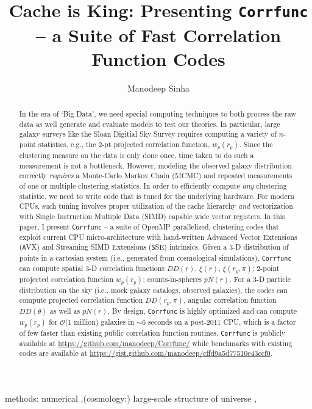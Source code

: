 \documentclass[preprint, 12pt, authoryear]{elsarticle}
\newcommand{\xir}{\ensuremath{{DD(r)}}\xspace}
\newcommand{\xiofr}{\ensuremath{{\xi(r)}}\xspace}
\newcommand{\wprp}{\ensuremath{{w_p(r_p)}}\xspace}
\newcommand{\xirppi}{\ensuremath{{\xi(r_p,\pi)}}\xspace}
\newcommand{\cis}{\ensuremath{{pN(r)}}\xspace}
\newcommand{\ddrppi}{\ensuremath{{DD(r_p,\pi)}}\xspace}
\newcommand{\wtheta}{\ensuremath{{DD(\theta)}}\xspace}
\newcommand{\avx}{\texttt AVX}
\newcommand{\sse}{\texttt SSE}
\begin{document}
\begin{frontmatter}

\title{Cache is King: Presenting {\tt Corrfunc} -- a Suite of Fast Correlation Function Codes}

\author[ms]{Manodeep Sinha}
\address[ms]{6902 Stevenson Center, Department of Physics \& Astronomy, Vanderbilt University, Nashville, TN 37235}

\begin{abstract}
In the era of `Big Data', we need special computing techniques to both process the raw data as well 
generate and evaluate models to test our theories. In particular, large galaxy surveys
like the Sloan Digitial Sky Survey requires computing a variety of $n$-point statistics, e.g., the 
2-pt projected correlation function, $\wprp$. 
Since the clustering measure on the data is only done once, time taken to do
such a measurement is not a bottleneck. However, modeling the observed galaxy distribution correctly
{\em requires} a Monte-Carlo Markov Chain (MCMC) and repeated measurements of one or multiple
clustering statistics. In order to efficiently compute {\em any} clustering statistic,
we need to write code that is tuned for the underlying hardware. For
modern CPUs, such tuning involves proper utilization of the cache hierarchy {\em and}
vectorization with Single Instruction Multiple Data (SIMD) capable wide vector registers. 
In this paper, I present {\tt Corrfunc} --  a suite of OpenMP parallelized, clustering
codes that exploit current CPU micro-architecture with hand-written Advanced
Vector Extensions (\avx) and  Streaming SIMD Extensions (\sse) intrinsics. 
Given a 3-D distribution of points in a cartesian system (i.e.,
generated from cosmological simulations), {\tt Corrfunc} can compute spatial
3-D correlation functions \xir, \xiofr, \xirppi; 2-point 
projected correlation function \wprp; counts-in-spheres \cis. For a 3-D
particle distribution on the sky (i.e., mock galaxy catalogs, observed galaxies), the codes can compute 
projected correlation function \ddrppi, angular correlation function \wtheta as
well as \cis.  By design, {\tt Corrfunc} is highly optimized 
and can compute \wprp for $\mathcal{O}$(1 million) galaxies in
$\sim 6$ seconds on a post-2011 CPU, which is a factor of few faster than 
existing public correlation function routines.  {\tt Corrfunc} is
publicly available at \url{https://github.com/manodeep/Corrfunc/} while
benchmarks with existing codes are available at
\url{https://gist.github.com/manodeep/cffd9a5d77510e43ccf0}.
\end{abstract}

\begin{keyword}
methods: numerical \sep (cosmology:) large-scale structure of universe \sep
\end{keyword}

\end{frontmatter}
\end{document}
